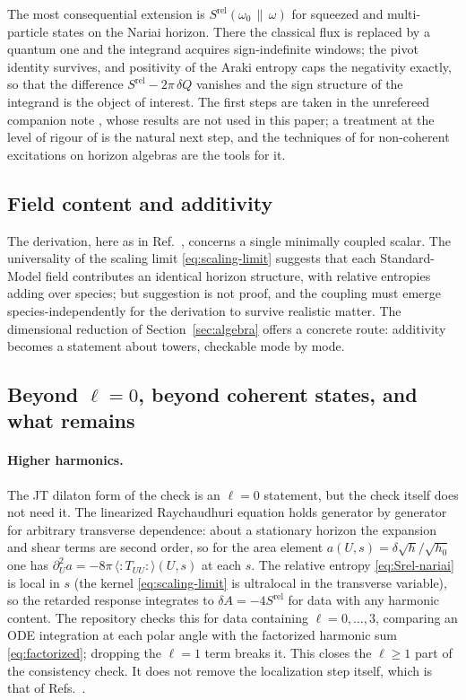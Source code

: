 \documentclass[11pt]{article}
\newcommand{\Srel}{S^{\mathrm{rel}}}
\newcommand{\Nariai}{Nariai}
\begin{document}
The most consequential extension is $\Srel(\omega_0\,\|\,\omega)$ for squeezed and multi-particle states on the \Nariai{} horizon. There the classical flux is replaced by a quantum one and the integrand acquires sign-indefinite windows; the pivot identity survives, and positivity of the Araki entropy caps the negativity exactly, so that the difference $\Srel - 2\pi\,\delta Q$ vanishes and the sign structure of the integrand is the object of interest. The first steps are taken in the unrefereed companion note \cite{SuppNariai}, whose results are not used in this paper; a treatment at the level of rigour of \cite{KPV} is the natural next step, and the techniques of \cite{Cadamuro} for non-coherent excitations on horizon algebras are the tools for it.

\subsection{Field content and additivity}

The derivation, here as in Ref.~\cite{DorauMuch}, concerns a single minimally coupled scalar. The universality of the scaling limit \eqref{eq:scaling-limit} suggests that each Standard-Model field contributes an identical horizon structure, with relative entropies adding over species; but suggestion is not proof, and the coupling must emerge species-independently for the derivation to survive realistic matter. The dimensional reduction of Section~\ref{sec:algebra} offers a concrete route: additivity becomes a statement about towers, checkable mode by mode.

\subsection{Beyond $\ell=0$, beyond coherent states, and what remains}

\paragraph{Higher harmonics.} The JT dilaton form of the check is an $\ell=0$ statement, but the check itself does not need it. The linearized Raychaudhuri equation holds generator by generator for arbitrary transverse dependence: about a stationary horizon the expansion and shear terms are second order, so for the area element $a(U,s)=\delta\sqrt h/\sqrt{h_0}$ one has $\partial_U^2 a=-8\pi\,\langle{:}T_{UU}{:}\rangle(U,s)$ at each $s$. The relative entropy \eqref{eq:Srel-nariai} is local in $s$ (the kernel \eqref{eq:scaling-limit} is ultralocal in the transverse variable), so the retarded response integrates to $\delta A=-4\Srel$ for data with any harmonic content. The repository checks this for data containing $\ell=0,\dots,3$, comparing an ODE integration at each polar angle with the factorized harmonic sum \eqref{eq:factorized}; dropping the $\ell=1$ term breaks it. This closes the $\ell\ge1$ part of the consistency check. It does not remove the localization step itself, which is that of Refs.~\cite{Jacobson,DorauMuch}.
\end{document}

